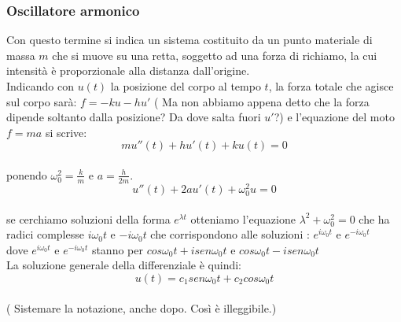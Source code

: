 \documentclass[a4paper,twoside]{article}
\theoremstyle{definition}
\numberwithin{theorem}{section}
\begin{document}
\subsubsection{Oscillatore armonico}
Con questo termine si indica un sistema costituito da un punto materiale di massa $m$ che si muove su una retta, soggetto ad una forza di richiamo, la cui intensità è proporzionale alla distanza dall'origine. \\
Indicando con $u(t)$ la posizione del corpo al tempo $t$, la forza totale che agisce sul corpo sarà: $f=-ku-hu'$ ({\color{red} Ma non abbiamo appena detto che la forza dipende soltanto dalla posizione? Da dove salta fuori $u'$?}) e l'equazione del moto $f=ma$ si scrive: $$mu''(t)+hu'(t)+ku(t)=0$$\\
ponendo $\omega_0^2=\frac{k}{m}$ e $a=\frac{h}{2m}$.\\
$$u''(t)+2au'(t)+\omega_0^2u=0$$ \\
se cerchiamo soluzioni della forma $e^{\lambda t}$ otteniamo l'equazione $\lambda^2 + \omega_0^2=0$ che ha radici complesse $i\omega_0t$ e $-i\omega_0t$ che corrispondono alle soluzioni : $e^{i\omega_0t}$ e $e^{-i\omega_0t}$\\
dove  $e^{i\omega_0t}$ e $e^{-i\omega_0t}$ stanno per $cos\omega_0t+isen\omega_0t$ e $cos\omega_0t-isen\omega_0t$ \\
La soluzione generale della differenziale è quindi: $$u(t)=c_1sen\omega_0t+c_2cos\omega_0t$$\\
({\color{red} Sistemare la notazione, anche dopo. Così è illeggibile.})
\end{document}
